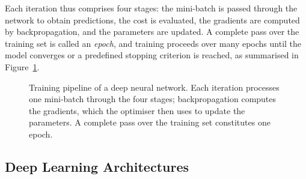 Each iteration thus comprises four stages: the mini-batch is passed through the
network to obtain predictions, the cost is evaluated, the gradients are computed
by backpropagation, and the parameters are updated. A complete pass over the
training set is called an \emph{epoch}, and training proceeds over many epochs
until the model converges or a predefined stopping criterion is reached, as
summarised in Figure~\ref{fig:training_pipeline}.

\begin{figure}[htbp]
\centering


\caption[Training pipeline of a deep neural network]{Training pipeline of a deep
neural network. Each iteration processes one mini-batch through the four stages;
backpropagation computes the gradients, which the optimiser then uses to update
the parameters. A complete pass over the training set constitutes one epoch.}
\label{fig:training_pipeline}

\end{figure}

\subsection{Deep Learning Architectures} \label{sec:dparqui}

